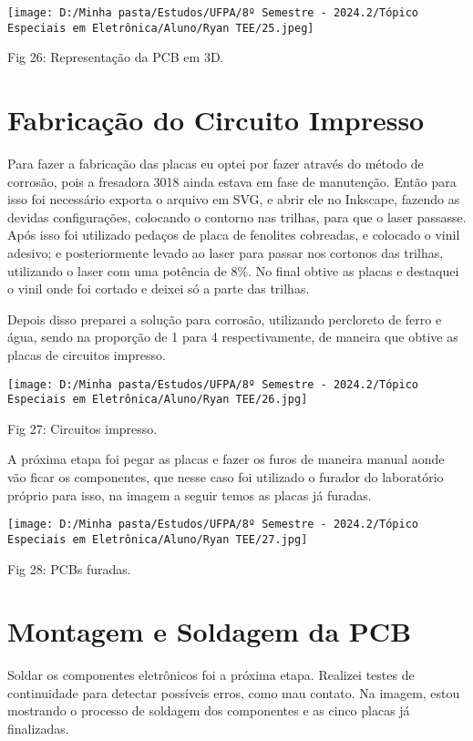 \documentclass[
]{book}
\begin{document}
\texttt{[image: D:/Minha pasta/Estudos/UFPA/8º Semestre - 2024.2/Tópico Especiais em Eletrônica/Aluno/Ryan TEE/25.jpeg]}

Fig 26: Representação da PCB em 3D.

\section{Fabricação do Circuito Impresso}\label{fabricauxe7uxe3o-do-circuito-impresso}

Para fazer a fabricação das placas eu optei por fazer através do método de corrosão, pois a fresadora 3018 ainda estava em fase de manutenção. Então para isso foi necessário exporta o arquivo em SVG, e abrir ele no Inkscape, fazendo as devidas configurações, colocando o contorno nas trilhas, para que o laser passasse. Após isso foi utilizado pedaços de placa de fenolites cobreadas, e colocado o vinil adesivo; e posteriormente levado ao laser para passar nos cortonos das trilhas, utilizando o laser com uma potência de 8\%. No final obtive as placas e destaquei o vinil onde foi cortado e deixei só a parte das trilhas.

Depois disso preparei a solução para corrosão, utilizando percloreto de ferro e água, sendo na proporção de 1 para 4 respectivamente, de maneira que obtive as placas de circuitos impresso.

\texttt{[image: D:/Minha pasta/Estudos/UFPA/8º Semestre - 2024.2/Tópico Especiais em Eletrônica/Aluno/Ryan TEE/26.jpg]}

Fig 27: Circuitos impresso.

A próxima etapa foi pegar as placas e fazer os furos de maneira manual aonde vão ficar os componentes, que nesse caso foi utilizado o furador do laboratório próprio para isso, na imagem a seguir temos as placas já furadas.

\texttt{[image: D:/Minha pasta/Estudos/UFPA/8º Semestre - 2024.2/Tópico Especiais em Eletrônica/Aluno/Ryan TEE/27.jpg]}

Fig 28: PCBs furadas.

\section{Montagem e Soldagem da PCB}\label{montagem-e-soldagem-da-pcb}

Soldar os componentes eletrônicos foi a próxima etapa. Realizei testes de continuidade para detectar possíveis erros, como mau contato. Na imagem, estou mostrando o processo de soldagem dos componentes e as cinco placas já finalizadas.
\end{document}
